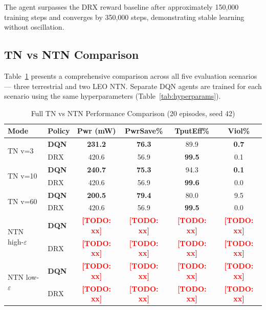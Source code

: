 \documentclass[conference]{IEEEtran}
\newcommand{\TODO}[1]{\textcolor{red}{\textbf{[TODO: #1]}}}
\begin{document}
The agent surpasses the DRX reward baseline after approximately 150,000
training steps and converges by 350,000 steps, demonstrating stable
learning without oscillation.

\subsection{TN vs NTN Comparison}
\label{subsec:ntn_results}

Table~\ref{tab:ntn_results} presents a comprehensive comparison across
all five evaluation scenarios — three terrestrial and two LEO NTN.
Separate DQN agents are trained for each scenario using the same
hyperparameters (Table~\ref{tab:hyperparams}).

\begin{table}[t]
  \centering
  \caption{Full TN vs NTN Performance Comparison (20 episodes, seed 42)}
  \label{tab:ntn_results}
  \begin{tabular}{llcccc}
    \toprule
    Mode & Policy & Pwr (mW) & PwrSave\% & TputEff\% & Viol\% \\
    \midrule
    \multirow{2}{*}{TN v=3}
      & \textbf{DQN} & \textbf{231.2} & \textbf{76.3} & 89.9 & \textbf{0.7} \\
      & DRX          & 420.6          & 56.9          & \textbf{99.5} & 0.1 \\
    \midrule
    \multirow{2}{*}{TN v=10}
      & \textbf{DQN} & \textbf{240.7} & \textbf{75.3} & 94.3 & \textbf{0.1} \\
      & DRX          & 420.6          & 56.9          & \textbf{99.6} & 0.0 \\
    \midrule
    \multirow{2}{*}{TN v=60}
      & \textbf{DQN} & \textbf{200.5} & \textbf{79.4} & 80.0 & 9.5 \\
      & DRX          & 420.6          & 56.9          & \textbf{99.5} & 0.0 \\
    \midrule
    \multirow{2}{*}{NTN high-$\varepsilon$}
      & \textbf{DQN} & \TODO{xx} & \TODO{xx} & \TODO{xx} & \TODO{xx} \\
      & DRX          & \TODO{xx} & \TODO{xx} & \TODO{xx} & \TODO{xx} \\
    \midrule
    \multirow{2}{*}{NTN low-$\varepsilon$}
      & \textbf{DQN} & \TODO{xx} & \TODO{xx} & \TODO{xx} & \TODO{xx} \\
      & DRX          & \TODO{xx} & \TODO{xx} & \TODO{xx} & \TODO{xx} \\
    \bottomrule
  \end{tabular}
\end{table}
\end{document}
